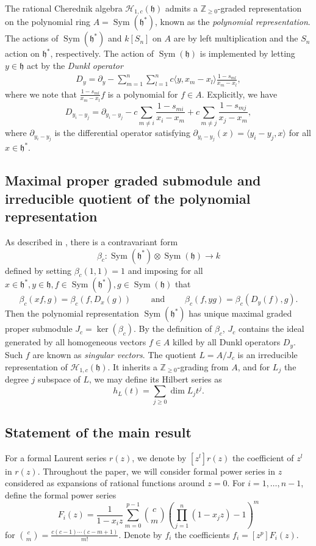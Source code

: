 \documentclass{amsart}
\numberwithin{equation}{section}
\theoremstyle{definition}
\newcommand{\ZZ}{\mathbb{Z}}
\newcommand{\h}{\mathfrak{h}}
\newcommand{\HH}{\mathcal{H}}
\newcommand{\Sym}{\operatorname{Sym}}
\begin{document}
The rational Cherednik algebra $\HH_{1, c}(\h)$ admits a $\ZZ_{\geq 0}$-graded representation on the polynomial ring $A = \Sym(\h^*)$, known as the \textit{polynomial representation}.  The actions of $\Sym(\h^*)$ and $k[S_n]$ on $A$ are by left multiplication and the $S_n$ action on $\h^*$, respectively.  The action of $\Sym(\h)$ is implemented by letting $y \in \h$ act by the \textit{Dunkl operator}
\begin{align*}
D_y =  \partial_y  - \sum_{m=1}^{n} \sum_{l=1}^{n} c  \langle y, x_m-x_l \rangle \frac{1-s_{ml}}{x_m - x_l},
\end{align*}
where we note that $\frac{1-s_{ml}}{x_m - x_l}f$ is a polynomial for $f \in A$. Explicitly, we have  
\[
D_{y_i - y_j} =  \partial_{y_i-y_j}-c\sum_{m \ne i} \frac{1-s_{mi}}{x_i-x_m}+c\sum_{m \ne j} \frac{1-s_{mj}}{x_j-x_m},
\] \noindent
where $\partial_{y_i-y_j}$ is the differential operator satisfying $\partial_{y_i-y_j}(x) = \langle y_i-y_j,x\rangle$ for all $x \in \h^*$.  

\subsection{Maximal proper graded submodule and irreducible quotient of the polynomial representation}

As described in \cite[Section 2.5]{BC1}, there is a contravariant form 
\[
\beta_c: \Sym(\h^*) \otimes \Sym(\h) \to k
\]
defined by setting $\beta_c(1, 1) = 1$ and imposing for all $x \in \h^*, y \in \h, f \in \Sym(\h^*), g \in \Sym(\h)$ that
\[
\beta_c(xf,g)=\beta_c(f,D_x(g)) \qquad \text{ and } \qquad \beta_c(f,yg) = \beta_c(D_y(f),g).
\]
Then the polynomial representation $\Sym(\h^*)$ has unique maximal graded proper submodule $J_c = \ker(\beta_c)$.  By the definition of $\beta_c$, $J_c$ contains the ideal generated by all homogeneous vectors $f \in A$ killed by all Dunkl operators $D_y$.  Such $f$ are known as \textit{singular vectors}.  The quotient $L = A/J_c$ is an irreducible representation of $\HH_{1,c}(\h)$.  It inherits a $\ZZ_{\geq 0}$-grading from $A$, and for $L_j$ the degree $j$ subspace of $L$, we may define its Hilbert series as
\[
h_L(t) = \sum_{j \geq 0} \dim L_j t^j.
\]

\subsection{Statement of the main result}

For a formal Laurent series $r(z)$, we denote by $[z^l] r(z)$ the coefficient of $z^l$ in $r(z)$.  Throughout the paper, we will consider formal power series in $z$ considered as expansions of rational functions around $z = 0$. For $i = 1, \ldots, n - 1$, define the formal power series
\[
F_i(z)=\frac{1}{1-x_iz} \sum_{m=0}^{p-1} \binom{c}{m}\left(\prod_{j=1}^{n} (1-x_jz) - 1\right)^m
\]
for $\binom{c}{m} = \frac{c (c - 1) \cdots (c - m + 1)}{m!}$.  Denote by $f_i$ the coefficients $f_i = [z^p] F_i(z)$.
\end{document}
